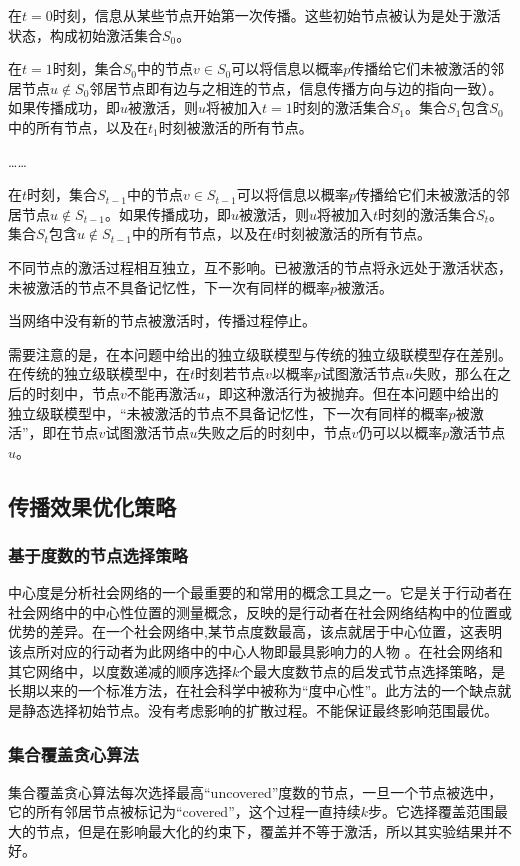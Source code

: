 \documentclass[UTF8]{ctexart}
\newcommand{\upcite}[1]{\textsuperscript{\textsuperscript{\cite{#1}}}}
\begin{document}
在$t=0$时刻，信息从某些节点开始第一次传播。这些初始节点被认为是处于激活状态，构成初始激活集合$S_0$。

在$t=1$时刻，集合$S_0$中的节点$v\in S_{0}$可以将信息以概率$p$传播给它们未被激活的邻居节点$u\notin S_0$邻居节点即有边与之相连的节点，信息传播方向与边的指向一致）。如果传播成功，即$u$被激活，则$u$将被加入$t=1$时刻的激活集合$S_1$。集合$S_1$包含$S_0$中的所有节点，以及在$t_1$时刻被激活的所有节点。

\ldots \ldots

在$t$时刻，集合$S_{t-1}$中的节点$v\in S_{t-1}$可以将信息以概率$p$传播给它们未被激活的邻居节点$u\notin S_{t-1}$。如果传播成功，即$u$被激活，则$u$将被加入$t$时刻的激活集合$S_t$。集合$S_t$包含$u\notin S_{t-1}$中的所有节点，以及在$t$时刻被激活的所有节点。

不同节点的激活过程相互独立，互不影响。已被激活的节点将永远处于激活状态，未被激活的节点不具备记忆性，下一次有同样的概率$p$被激活。

当网络中没有新的节点被激活时，传播过程停止。

需要注意的是，在本问题中给出的独立级联模型与传统的独立级联模型存在差别。在传统的独立级联模型中，在$t$时刻若节点$v$以概率$p$试图激活节点$u$失败，那么在之后的时刻中，节点$v$不能再激活$u$，即这种激活行为被抛弃\upcite{fudan}。但在本问题中给出的独立级联模型中，“未被激活的节点不具备记忆性，下一次有同样的概率$p$被激活”，即在节点$v$试图激活节点$u$失败之后的时刻中，节点$v$仍可以以概率$p$激活节点$u$。

\subsection{传播效果优化策略}
\subsubsection{基于度数的节点选择策略}
中心度是分析社会网络的一个最重要的和常用的概念工具之一。它是关于行动者在社会网络中的中心性位置的测量概念，反映的是行动者在社会网络结构中的位置或优势的差异。在一个社会网络中,某节点度数最高，该点就居于中心位置，这表明该点所对应的行动者为此网络中的中心人物即最具影响力的人物 \upcite{Lin}。在社会网络和其它网络中，以度数递减的顺序选择$k$个最大度数节点的启发式节点选择策略，是长期以来的一个标准方法，在社会科学中被称为“度中心性”。此方法的一个缺点就是静态选择初始节点。没有考虑影响的扩散过程。不能保证最终影响范围最优。

\subsubsection{集合覆盖贪心算法}
集合覆盖贪心算法\upcite{Estevez}每次选择最高“uncovered”度数的节点，一旦一个节点被选中，它的所有邻居节点被标记为“covered”，这个过程一直持续$k$步。它选择覆盖范围最大的节点，但是在影响最大化的约束下，覆盖并不等于激活，所以其实验结果并不好。
\end{document}
